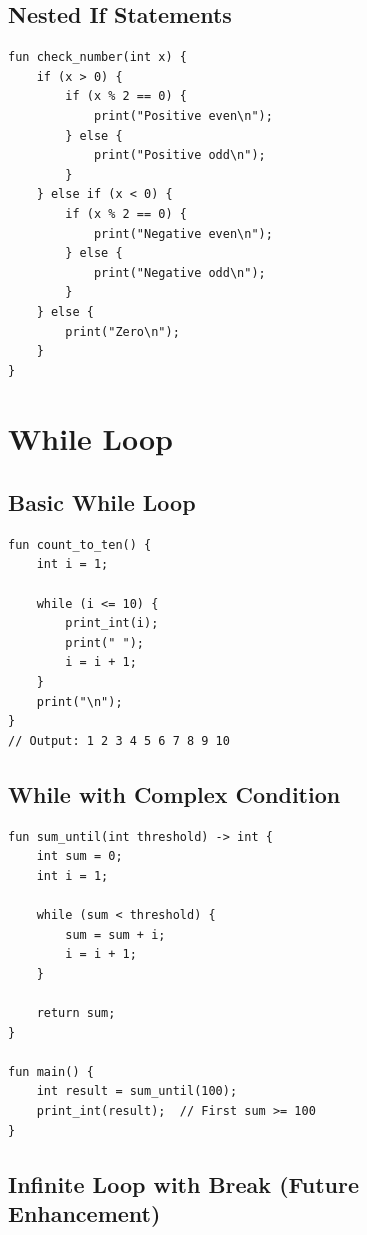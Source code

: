 \documentclass[12pt,a4paper,oneside]{book}
\begin{document}
\subsection{Nested If Statements}

\begin{lstlisting}[style=algo, caption={Nested Conditions}]
fun check_number(int x) {
    if (x > 0) {
        if (x % 2 == 0) {
            print("Positive even\n");
        } else {
            print("Positive odd\n");
        }
    } else if (x < 0) {
        if (x % 2 == 0) {
            print("Negative even\n");
        } else {
            print("Negative odd\n");
        }
    } else {
        print("Zero\n");
    }
}
\end{lstlisting}

\section{While Loop}

\subsection{Basic While Loop}

\begin{lstlisting}[style=algo, caption={While Loop Example}]
fun count_to_ten() {
    int i = 1;
    
    while (i <= 10) {
        print_int(i);
        print(" ");
        i = i + 1;
    }
    print("\n");
}
// Output: 1 2 3 4 5 6 7 8 9 10
\end{lstlisting}

\subsection{While with Complex Condition}

\begin{lstlisting}[style=algo, caption={Sum Until Threshold}]
fun sum_until(int threshold) -> int {
    int sum = 0;
    int i = 1;
    
    while (sum < threshold) {
        sum = sum + i;
        i = i + 1;
    }
    
    return sum;
}

fun main() {
    int result = sum_until(100);
    print_int(result);  // First sum >= 100
}
\end{lstlisting}

\subsection{Infinite Loop with Break (Future Enhancement)}
\end{document}
